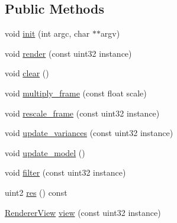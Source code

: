 \subsection*{Public Methods}
\begin{DoxyCompactItemize}
\item 
void \hyperlink{struct_renderer_a6d1211c5c08f587f0a3dde83cf6749e0}{init} (int argc, char $\ast$$\ast$argv)
\item 
void \hyperlink{struct_renderer_a1c07882208a3b4a37c5d19d2367cfa19}{render} (const uint32 instance)
\item 
void \hyperlink{struct_renderer_ac46720b3fc0dbb2fc37674766490a8c4}{clear} ()
\item 
void \hyperlink{struct_renderer_ada44128e95feff3d6525ed641c092de0}{multiply\+\_\+frame} (const float scale)
\item 
void \hyperlink{struct_renderer_aea918ac9f9dd97326243016369d82598}{rescale\+\_\+frame} (const uint32 instance)
\item 
void \hyperlink{struct_renderer_a16d987b3115618f559ad3ce10511f3ec}{update\+\_\+variances} (const uint32 instance)
\item 
void \hyperlink{struct_renderer_a7056024364d5f23df8c6350e4fb1ec08}{update\+\_\+model} ()
\item 
void \hyperlink{struct_renderer_a6d93cf5fc9b7e96d3d52e98e03c436e1}{filter} (const uint32 instance)
\item 
uint2 \hyperlink{struct_renderer_a8279a55b932cc24163fda7ed636b3380}{res} () const
\item 
\hyperlink{struct_renderer_view}{Renderer\+View} \hyperlink{struct_renderer_abf4fa769e2ab796aa38791cf0e6d826c}{view} (const uint32 instance)
\end{DoxyCompactItemize}
